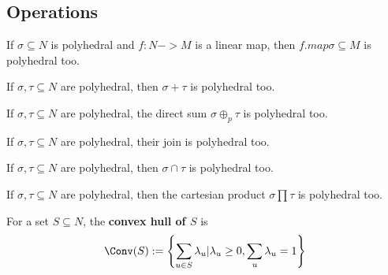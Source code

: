 \subsection{Operations}

\begin{proposition}
  \label{linear-transformation-polyhedral-cone}
  If \( \sigma \subseteq N \) is
  polyhedral and \(f : N -> M\) is a linear map, then \( f.map \sigma \subseteq M \) is polyhedral too.
\end{proposition}

\begin{proposition}
  \label{sum-polyhedral-cone}
  If \( \sigma, \tau \subseteq N \) are
  polyhedral, then \( \sigma + \tau \) is polyhedral too.
\end{proposition}

\begin{proposition}
  \label{direct-sum-polyhedral-cone}
  If \( \sigma, \tau \subseteq N \) are
  polyhedral, the direct sum \( \sigma \oplus_p \tau \) is polyhedral too.
\end{proposition}

\begin{proposition}
  \label{join-polyhedral-cone}
  If \( \sigma, \tau \subseteq N \) are
  polyhedral, their join is polyhedral too.
\end{proposition}

\begin{proposition}
  \label{intersection-polyhedral-cone}
  If \( \sigma, \tau \subseteq N \) are
  polyhedral, then \( \sigma \cap \tau \) is polyhedral too.
\end{proposition}

\begin{proposition}
  \label{product-polyhedral-cone}
  If \( \sigma, \tau \subseteq N \) are
  polyhedral, then the cartesian product \( \sigma \prod \tau \) is polyhedral too.
\end{proposition}


\begin{definition}
  \label{convex-hull}
  \uses{}
  For a set $S \subseteq N$, the {\bf convex hull of $S$} is
  $$\Conv(S) := \left\{\sum_{u \in S} \lambda_u | \lambda_u \ge 0, \sum_u \lambda_u = 1\right\}$$
\end{definition}

